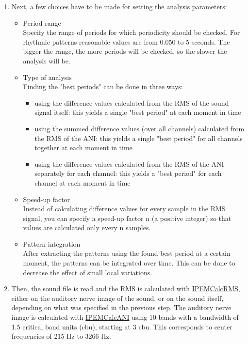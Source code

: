 \begin{enumerate}
\item
    Next, a few choices have to be made for setting the analysis parameters:
    \begin{itemize}
    \item Period range\\
        Specify the range of periods for which periodicity should be
        checked. For rhythmic patterns reasonable values are from 0.050 to 5
        seconds. The bigger the range, the more periods will be checked, so
        the slower the analysis will be.
    \item Type of analysis\\
        Finding the "best periods" can be done in three ways:
        \begin{itemize}
        \item using the difference values calculated from the RMS of
        the sound signal itself: this yields a single "best period" at
        each moment in time
        \item using the summed difference values (over all channels) calculated from the RMS of
        the ANI: this yields a single "best period" for all channels
        together at each moment in time
        \item using the difference values calculated from the RMS of
        the ANI separately for each channel: this yields a "best period" for each channel at each moment in
        time
        \end{itemize}
    \item Speed-up factor\\
        Instead of calculating difference values for every sample in the RMS
        signal, you can specify a speed-up factor n (a positive
        integer) so that values are calculated only every n samples.
    \item Pattern integration\\
        After extracting the patterns using the found best period
        at a certain moment, the patterns can be integrated over
        time. This can be done to decrease the effect of small local
        variations.
    \end{itemize}

\item
    Then, the sound file is read and the RMS is calculated with
    \hyperlink{FuncRef:IPEMCalcRMS}{IPEMCalcRMS}, either on the
    auditory nerve image of the sound, or on the sound itself,
    depending on what was specified in the previous step. The
    auditory nerve image is calculated with
    \hyperlink{FuncRef:IPEMCalcANI}{IPEMCalcANI} using 10 bands
    with a bandwidth of 1.5 critical band units (cbu), starting
    at 3 cbu. This corresponds to center frequencies of 215 Hz to
    3266 Hz.


\end{enumerate}
